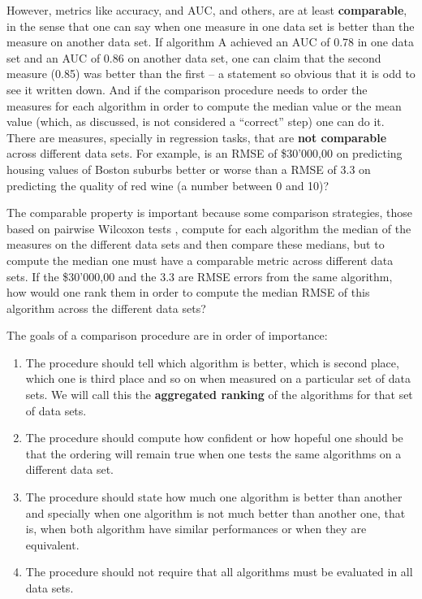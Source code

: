 \documentclass[twoside,11pt,preprint]{article}
\begin{document}
However, metrics like accuracy, and AUC, and others, are at least
\textbf{comparable}, in the sense that one can say when one measure in one
data set is better than the measure on another data set. If algorithm
A achieved an AUC of 0.78 in one data set and an AUC of 0.86 on
another data set, one can claim that the second measure (0.85) was
better than the first -- a statement so obvious that it is odd to see it
written down. And if the comparison procedure needs to order the
measures for each algorithm in order to compute the median value or
the mean value (which, as discussed, is not considered a ``correct''
step) one can do it. There are measures, specially in regression
tasks, that are \textbf{not comparable} across different data sets. For
example, is an RMSE of \$30'000,00 on predicting housing values of
Boston suburbs better or worse than a RMSE of 3.3 on predicting the
quality of red wine (a number between 0 and 10)?

The comparable property is important because some comparison
strategies, those based on pairwise Wilcoxon tests \citep{benavoli2017time, benavoli2016should, STAPOR2021107219}, compute for each algorithm
the median of the measures on the different data sets and then compare
these medians, but to compute the median one must have a comparable
metric across different data sets. If the \$30'000,00 and the 3.3 are
RMSE errors from the same algorithm, how would one rank them in order
to compute the median RMSE of this algorithm across the different data
sets?

The goals of a comparison procedure are in order of importance:

\begin{enumerate}
\def\labelenumi{\arabic{enumi}.}
\item
  The procedure should tell which algorithm is better, which is second place, which one
  is third place and so on when measured on a particular set of data
  sets. We will call this the \textbf{aggregated ranking} of the
  algorithms for that set of data sets.
\item
  The procedure should compute how confident or how hopeful one should be that the ordering
  will remain true when one tests the same algorithms on a different
  data set.
\item
  The procedure should state how much one algorithm is
  better than another and specially when one algorithm is not much
  better than another one, that is, when both algorithm have similar
  performances or when they are equivalent.
\item
  The procedure should not require that all algorithms must be evaluated in all data sets.
\end{enumerate}
\end{document}
